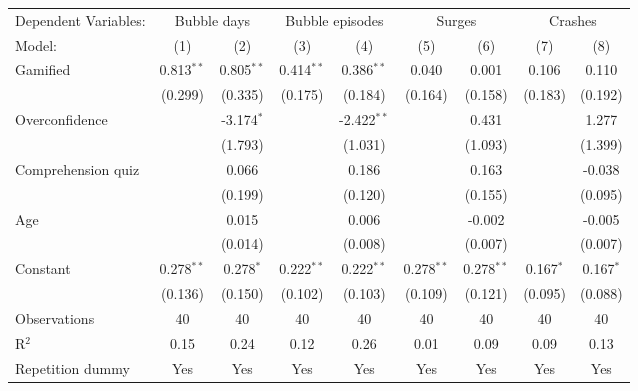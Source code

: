 \begin{tabular}{lcccccccc}
   \tabularnewline \midrule \midrule
   Dependent Variables: & \multicolumn{2}{c}{Bubble days} & \multicolumn{2}{c}{Bubble episodes} & \multicolumn{2}{c}{Surges} & \multicolumn{2}{c}{Crashes}\\
   Model:             & (1)          & (2)          & (3)          & (4)           & (5)          & (6)          & (7)         & (8)\\  
   \midrule
   Gamified           & 0.813$^{**}$ & 0.805$^{**}$ & 0.414$^{**}$ & 0.386$^{**}$  & 0.040        & 0.001        & 0.106       & 0.110\\   
                      & (0.299)      & (0.335)      & (0.175)      & (0.184)       & (0.164)      & (0.158)      & (0.183)     & (0.192)\\   
   Overconfidence     &              & -3.174$^{*}$ &              & -2.422$^{**}$ &              & 0.431        &             & 1.277\\   
                      &              & (1.793)      &              & (1.031)       &              & (1.093)      &             & (1.399)\\   
   Comprehension quiz &              & 0.066        &              & 0.186         &              & 0.163        &             & -0.038\\   
                      &              & (0.199)      &              & (0.120)       &              & (0.155)      &             & (0.095)\\   
   Age                &              & 0.015        &              & 0.006         &              & -0.002       &             & -0.005\\   
                      &              & (0.014)      &              & (0.008)       &              & (0.007)      &             & (0.007)\\   
   Constant           & 0.278$^{**}$ & 0.278$^{*}$  & 0.222$^{**}$ & 0.222$^{**}$  & 0.278$^{**}$ & 0.278$^{**}$ & 0.167$^{*}$ & 0.167$^{*}$\\   
                      & (0.136)      & (0.150)      & (0.102)      & (0.103)       & (0.109)      & (0.121)      & (0.095)     & (0.088)\\   
   \midrule
   Observations       & 40           & 40           & 40           & 40            & 40           & 40           & 40          & 40\\  
   R$^2$              & 0.15         & 0.24         & 0.12         & 0.26          & 0.01         & 0.09         & 0.09        & 0.13\\  
   Repetition dummy   & Yes          & Yes          & Yes          & Yes           & Yes          & Yes          & Yes         & Yes\\  
   \midrule \midrule
\end{tabular}
